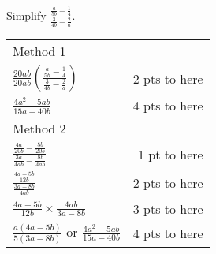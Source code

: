 {
	Simplify $\displaystyle \frac{\frac{a}{5b}-\frac{1}{4}}{\frac{3}{4b}-\frac{2}{a}}$.
}
{
	\begin{tabular}{l r}
	Method 1 \\
	$\frac{20ab}{20ab}(\frac{\frac{a}{5b}-\frac{1}{4}}{\frac{3}{4b}-\frac{2}{a}})$ & 2 pts to here\\
	$\frac{4a^2-5ab}{15a-40b}$ & 4 pts to here\\
	Method 2 \\
	$\frac{\frac{4a}{20b}-\frac{5b}{20b}}{\frac{3a}{4ab}-\frac{8b}{4ab}}$ & 1 pt to here\\
	$\frac{\frac{4a-5b}{12b}}{\frac{3a-8b}{4ab}}$ & 2 pts to here\\
	$\frac{4a-5b}{12b} \times \frac{4ab}{3a-8b}$ & 3 pts to here\\
	$\frac{a(4a-5b)}{5(3a-8b)}$  or $\frac{4a^2-5ab}{15a-40b}$ & 4 pts to here
	\end{tabular}
}
